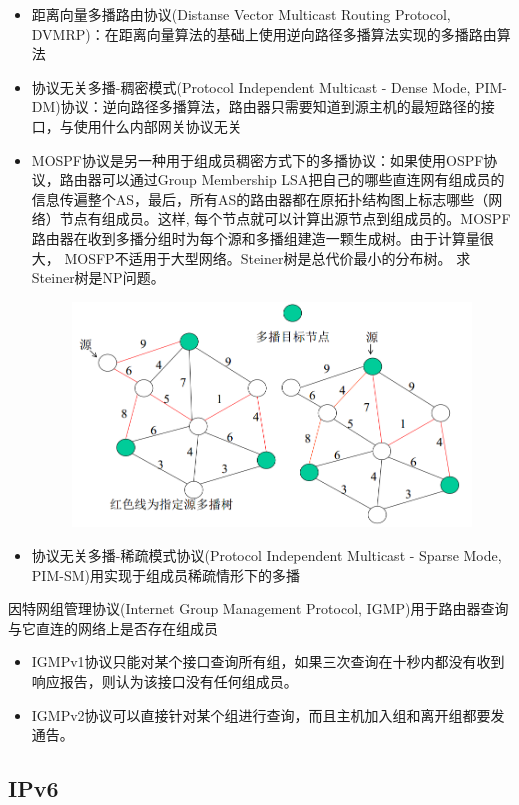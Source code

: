 \myhline
\begin{itemize}
	\item 距离向量多播路由协议(Distanse	Vector Multicast Routing Protocol, DVMRP)：在距离向量算法的基础上使用逆向路径多播算法实现的多播路由算法
	\item 协议无关多播-稠密模式(Protocol Independent Multicast - Dense Mode, PIM-DM)协议：逆向路径多播算法，路由器只需要知道到源主机的最短路径的接口，与使用什么内部网关协议无关
	\item MOSPF协议是另一种用于组成员稠密方式下的多播协议：如果使用OSPF协议，路由器可以通过Group Membership LSA把自己的哪些直连网有组成员的信息传遍整个AS，最后，所有AS的路由器都在原拓扑结构图上标志哪些（网络）节点有组成员。这样, 每个节点就可以计算出源节点到组成员的。MOSPF路由器在收到多播分组时为每个源和多播组建造一颗生成树。由于计算量很大， MOSFP不适用于大型网络。Steiner树是总代价最小的分布树。 求Steiner树是NP问题。
	\begin{figure}[H]
		\centering
		\includegraphics[width=0.6\linewidth]{fig/MOSPF.png}
	\end{figure}
	\item 协议无关多播-稀疏模式协议(Protocol Independent Multicast - Sparse Mode, PIM-SM)用实现于组成员稀疏情形下的多播
\end{itemize}

\myhline
因特网组管理协议(Internet Group Management Protocol, IGMP)用于路由器查询与它直连的网络上是否存在组成员
\begin{itemize}
	\item IGMPv1协议只能对某个接口查询所有组，如果三次查询在十秒内都没有收到响应报告，则认为该接口没有任何组成员。
	\item IGMPv2协议可以直接针对某个组进行查询，而且主机加入组和离开组都要发通告。
\end{itemize}

\subsection{IPv6}
